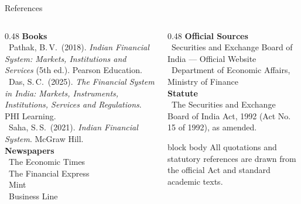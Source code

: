 \documentclass[aspectratio=169,10pt]{beamer}
\begin{document}
	\begin{frame}{References}
		\sloppy
		\begin{columns}[T, onlytextwidth]
			\begin{column}{0.48\textwidth}
				\color{rpText}\footnotesize
				\textcolor{rpIris}{\textbf{Books}}\\[3pt]
				\textbullet\ Pathak, B.\,V.\ (2018). \textit{Indian Financial System: Markets, Institutions and Services} (5th ed.). Pearson Education.\\[3pt]
				\textbullet\ Das, S.\,C.\ (2025). \textit{The Financial System in India: Markets, Instruments, Institutions, Services and Regulations}. PHI Learning.\\[3pt]
				\textbullet\ Saha, S.\,S.\ (2021). \textit{Indian Financial System}. McGraw Hill.\\[6pt]
				\textcolor{rpIris}{\textbf{Newspapers}}\\[3pt]
				\textbullet\ The Economic Times\\[1pt]
				\textbullet\ The Financial Express\\[1pt]
				\textbullet\ Mint\\[1pt]
				\textbullet\ Business Line
			\end{column}
			\begin{column}{0.48\textwidth}
				\color{rpText}\footnotesize
				\textcolor{rpIris}{\textbf{Official Sources}}\\[3pt]
				\textbullet\ Securities and Exchange Board of India --- Official Website\\[3pt]
				\textbullet\ Department of Economic Affairs, Ministry of Finance\\[6pt]
				\textcolor{rpIris}{\textbf{Statute}}\\[3pt]
				\textbullet\ The Securities and Exchange Board of India Act, 1992 (Act No.\,15 of 1992), as amended.\\[8pt]
				\begin{beamercolorbox}[rounded=true, sep=5pt]{block body}
					\scriptsize \textcolor{rpMuted}{All quotations and statutory references are drawn from the official Act and standard academic texts.}
				\end{beamercolorbox}
			\end{column}
		\end{columns}
	\end{frame}
	
\end{document}
